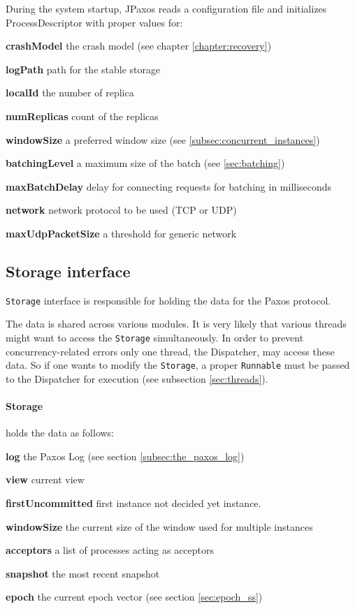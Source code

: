 During the system startup, JPaxos reads a configuration file and initializes ProcessDescriptor with proper values for:
\begin{tightList}[\setlength{\labelwidth}{0em}]
 \item[\textbf{crashModel}] the crash model (see chapter \ref{chapter:recovery})
 \item[\textbf{logPath}] path for the stable storage
 \item[\textbf{localId}] the number of replica %
 \item[\textbf{numReplicas}] count of the replicas %
 \item[\textbf{windowSize}] a preferred window size (see \ref{subsec:concurrent_instances})
 \item[\textbf{batchingLevel}] a maximum size of the batch (see \ref{sec:batching})
 \item[\textbf{maxBatchDelay}] delay for connecting requests for batching in milliseconds
 \item[\textbf{network}] network protocol to be used (TCP or UDP)
 \item[\textbf{maxUdpPacketSize}] a threshold for generic network
\end{tightList}

\subsection{Storage interface}
\label{subsec:storage_interface}

\texttt{Storage} interface is responsible for holding the data for the Paxos protocol.

The data is shared across various modules.
It is very likely that various threads might want to access the \texttt{Storage} simultaneously. In order to prevent concurrency-related errors only one thread, the Dispatcher, may access these data. So if one wants to modify the \texttt{Storage}, a proper \texttt{Runnable} must be passed to the Dispatcher for execution (see subsection \ref{sec:threads}).

\paragraph{\normalfont \ttfamily Storage}
holds the data as follows:
\begin{tightList}[\setlength{\labelwidth}{0em}]
  \item[\textbf{log}] the Paxos Log (see section \ref{subsec:the_paxos_log})
  \item[\textbf{view}] current view
  \item[\textbf{firstUncommitted}] first instance not decided yet instance.
  \item[\textbf{windowSize}] the current size of the window used for multiple instances
  \item[\textbf{acceptors}] a list of processes acting as acceptors
  \item[\textbf{snapshot}] the most recent snapshot
  \item[\textbf{epoch}] the current epoch vector (see section \ref{sec:epoch_ss})
\end{tightList}

